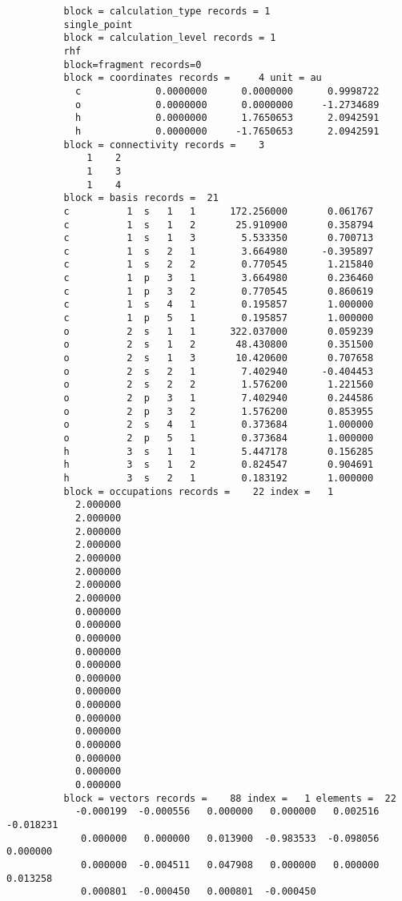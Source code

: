 \documentclass[11pt,fleqn]{article}
\begin{document}
{
\footnotesize
\begin{verbatim}
          block = calculation_type records = 1
          single_point             
          block = calculation_level records = 1
          rhf     
          block=fragment records=0
          block = coordinates records =     4 unit = au
            c             0.0000000      0.0000000      0.9998722
            o             0.0000000      0.0000000     -1.2734689
            h             0.0000000      1.7650653      2.0942591
            h             0.0000000     -1.7650653      2.0942591
          block = connectivity records =    3
              1    2
              1    3
              1    4
          block = basis records =  21
          c          1  s   1   1      172.256000       0.061767
          c          1  s   1   2       25.910900       0.358794
          c          1  s   1   3        5.533350       0.700713
          c          1  s   2   1        3.664980      -0.395897
          c          1  s   2   2        0.770545       1.215840
          c          1  p   3   1        3.664980       0.236460
          c          1  p   3   2        0.770545       0.860619
          c          1  s   4   1        0.195857       1.000000
          c          1  p   5   1        0.195857       1.000000
          o          2  s   1   1      322.037000       0.059239
          o          2  s   1   2       48.430800       0.351500
          o          2  s   1   3       10.420600       0.707658
          o          2  s   2   1        7.402940      -0.404453
          o          2  s   2   2        1.576200       1.221560
          o          2  p   3   1        7.402940       0.244586
          o          2  p   3   2        1.576200       0.853955
          o          2  s   4   1        0.373684       1.000000
          o          2  p   5   1        0.373684       1.000000
          h          3  s   1   1        5.447178       0.156285
          h          3  s   1   2        0.824547       0.904691
          h          3  s   2   1        0.183192       1.000000
          block = occupations records =    22 index =   1
            2.000000
            2.000000
            2.000000
            2.000000
            2.000000
            2.000000
            2.000000
            2.000000
            0.000000
            0.000000
            0.000000
            0.000000
            0.000000
            0.000000
            0.000000
            0.000000
            0.000000
            0.000000
            0.000000
            0.000000
            0.000000
            0.000000
          block = vectors records =    88 index =   1 elements =  22
            -0.000199  -0.000556   0.000000   0.000000   0.002516  -0.018231
             0.000000   0.000000   0.013900  -0.983533  -0.098056   0.000000
             0.000000  -0.004511   0.047908   0.000000   0.000000   0.013258
             0.000801  -0.000450   0.000801  -0.000450
          

\end{verbatim}}
\end{document}
